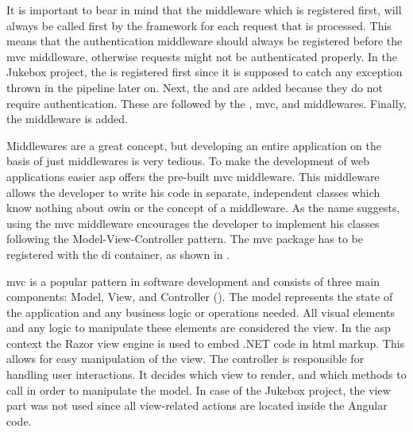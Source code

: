 It is important to bear in mind that the middleware which is registered first, will always be called first by the framework for each request that is processed. This means that the authentication middleware should always be registered before the \gls{mvc} middleware, otherwise requests might not be authenticated properly. In the Jukebox project, the  is registered first since it is supposed to catch any exception thrown in the pipeline later on. Next, the  and  are added because they do not require authentication. These are followed by the , \gls{mvc}, and  middlewares. Finally, the  middleware is added.

\newpage




Middlewares are a great concept, but developing an entire application on the basis of just middlewares is very tedious. To make the development of web applications easier \gls{asp} offers the pre-built \gls{mvc} middleware. This middleware allows the developer to write his code in separate, independent classes which know nothing about \gls{owin} or the concept of a middleware. As the name suggests, using the \gls{mvc} middleware encourages the developer to implement his classes following the Model-View-Controller pattern. The \gls{mvc} package has to be registered with the \gls{di} container, as shown in .

\gls{mvc} is a popular pattern in software development and consists of three main components: Model, View, and Controller (). The model represents the state of the application and any business logic or operations needed. All visual elements and any logic to manipulate these elements are considered the view. In the \gls{asp} context the Razor view engine is used to embed .NET code in \gls{html} markup. This allows for easy manipulation of the view. The controller is responsible for handling user interactions. It decides which view to render, and which methods to call in order to manipulate the model. In case of the Jukebox project, the view part was not used since all view-related actions are located inside the Angular code. \cite{mvcOverview}


